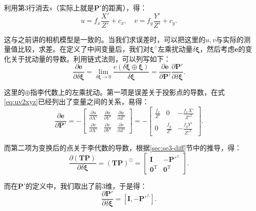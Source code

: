 利用第3行消去$s$（实际上就是$\bm{P}'$的距离），得：
\begin{equation}
\label{eq:uv2xyz}
u = {f_x}\frac{{X'}}{{Z'}} + {c_x}, \quad v = {f_y}\frac{{Y'}}{{Z'}} + {c_y}.
\end{equation}

这与之前讲的相机模型是一致的。当我们求误差时，可以把这里的$u,v$与实际的测量值比较，求差。在定义了中间变量后，我们对$\bm{\xi ^\wedge}$左乘扰动量$\delta \bm{ \xi}$，然后考虑$\bm{e}$的变化关于扰动量的导数。利用链式法则，可以列写如下：
\begin{equation}
\frac{{\partial \bm{e}}}{{\partial \delta \bm{\xi} }} = \mathop {\lim }\limits_{\delta \bm{\xi}  \to 0} \frac{{e\left( {\delta \bm{\xi}  \oplus \bm{\xi} } \right)}}{{\delta \bm{\xi} }}  = \frac{{\partial \bm{e}}}{{\partial \bm{P}'}}\frac{{\partial \bm{P}'}}{{\partial \delta \bm{\xi} }}.
\end{equation}

这里的$\oplus$指李代数上的左乘扰动。第一项是误差关于投影点的导数，在式\eqref{eq:uv2xyz}已经列出了变量之间的关系，易得：
\begin{equation}
\frac{{\partial \bm{e}}}{{\partial \bm{P}'}} = -\left[ 
{\begin{array}{*{20}{c}}
	{\frac{{\partial u}}{{\partial X'}}}&{\frac{{\partial u}}{{\partial Y'}}}&{\frac{{\partial u}}{{\partial Z'}}}\\
	{\frac{{\partial v}}{{\partial X'}}}&{\frac{{\partial v}}{{\partial Y'}}}&{\frac{{\partial v}}{{\partial Z'}}}
	\end{array}} \right] 
= - \left[ {\begin{array}{*{20}{c}}
	{\frac{{{f_x}}}{Z'}}&0&{ - \frac{{{f_x}X'}}{{{Z'^2}}}}\\
	0&{\frac{{{f_y}}}{Z'}}&{ - \frac{{{f_y}Y'}}{Z'^2}}
\end{array}} \right].
\end{equation}

而第二项为变换后的点关于李代数的导数，根据\ref{sec:se3-diff}节中的推导，得：
\begin{equation}
\frac{{\partial \left( \bm{TP} \right)}}{{\partial \delta \bm{\xi} }} = {\left( \bm{TP} \right)^ \odot } = \left[ 
\begin{array}{*{20}{cc}}
\bm{I} &- \bm{P}'^ \wedge \\
\bm{0}^\mathrm{T} &\bm{0}^\mathrm{T} 
\end{array}
\right].
\end{equation}

而在$\bm{P}'$的定义中，我们取出了前3维，于是得：
\begin{equation}
\frac{{\partial \bm{P}'}}{{\partial \delta \bm{\xi} }} = \left[ { \bm{I}, - {\bm{P}'^ \wedge }} \right].
\end{equation}


